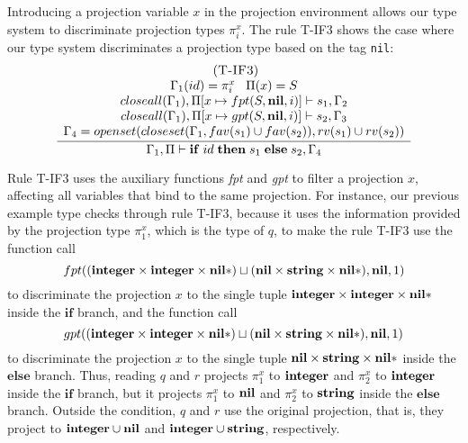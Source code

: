 Introducing a projection variable $x$ in the projection environment allows our
type system to discriminate projection types $\pi_{i}^{x}$.
The rule \textsc{T-IF3} shows the case where our type system
discriminates a projection type based on the tag \texttt{nil}:
\[
\begin{array}{c}
\; (\textsc{T-IF3})\\
\dfrac{\begin{array}{c}
       \Gamma_{1}(id) = \pi_{i}^{x} \;\;\; \Pi(x) = S\\
       closeall(\Gamma_{1}), \Pi[x \mapsto fpt(S,\mathbf{nil},i)] \vdash s_{1}, \Gamma_{2} \\
       closeall(\Gamma_{1}), \Pi[x \mapsto gpt(S,\mathbf{nil},i)] \vdash s_{2}, \Gamma_{3} \\
       \Gamma_{4} = openset(closeset(\Gamma_{1}, fav(s_{1}) \cup fav(s_{2})),rv(s_{1}) \cup rv(s_{2}))
      \end{array}}
      {\Gamma_{1}, \Pi \vdash \mathbf{if} \; id \; \mathbf{then} \; s_{1} \; \mathbf{else} \; s_{2}, \Gamma_{4}}
\end{array}
\]

Rule \textsc{T-IF3} uses the auxiliary functions \emph{fpt} and \emph{gpt}
to filter a projection $x$, affecting all variables that bind to the same projection.
For instance, our previous example type checks through rule \textsc{T-IF3},
because it uses the information provided by the projection type $\pi_{1}^{x}$,
which is the type of $q$, to make the rule \textsc{T-IF3} use the function call
\[
fpt((\mathbf{integer} \times \mathbf{integer} \times \mathbf{nil}{*}) \sqcup (\mathbf{nil} \times \mathbf{string} \times \mathbf{nil}{*}), \mathbf{nil}, 1)
\]
to discriminate the projection $x$ to the single tuple
$\mathbf{integer} \times \mathbf{integer} \times \mathbf{nil}{*}$ inside the $\mathbf{if}$ branch,
and the function call
\[
gpt((\mathbf{integer} \times \mathbf{integer} \times \mathbf{nil}{*}) \sqcup (\mathbf{nil} \times \mathbf{string} \times \mathbf{nil}{*}), \mathbf{nil}, 1)
\]
to discriminate the projection $x$ to the single tuple
$\mathbf{nil} \times \mathbf{string} \times \mathbf{nil}{*}$ inside the $\mathbf{else}$ branch.
Thus, reading $q$ and $r$ projects $\pi_{1}^{x}$ to $\mathbf{integer}$ and
$\pi_{2}^{x}$ to $\mathbf{integer}$ inside the $\mathbf{if}$ branch,
but it projects $\pi_{1}^{x}$ to $\mathbf{nil}$ and $\pi_{2}^{x}$ to $\mathbf{string}$
inside the $\mathbf{else}$ branch.
Outside the condition, $q$ and $r$ use the original projection, that is,
they project to $\mathbf{integer} \cup \mathbf{nil}$ and $\mathbf{integer} \cup \mathbf{string}$, respectively.

